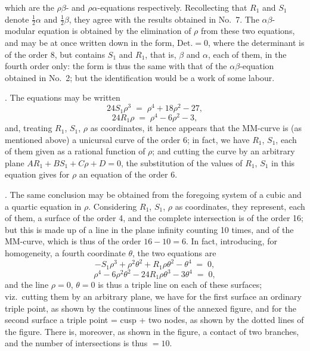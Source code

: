\documentclass[11pt]{article}
\begin{document}
\newpage

\noindent which are the $\rho\beta$- and $\rho\alpha$-equations respectively. Recollecting that $R_1$ and $S_1$ denote $\tfrac{1}{2}\alpha$ and $\tfrac{1}{2}\beta$, they agree with the results obtained in No.~7. The $\alpha\beta$-modular equation is obtained by the elimination of $\rho$ from these two equations, and may be at once written down in the form, $\mathrm{Det.} = 0$, where the determinant is of the order 8, but contains $S_1$ and $R_1$, that is, $\beta$ and $\alpha$, each of them, in the fourth order only: the form is thus the same with that of the $\alpha\beta$-equation obtained in No.~2; but the identification would be a work of some labour.

\medskip

. The equations may be written
\[
24 S_1\rho^3 \;=\; \rho^4 + 18\rho^2 - 27,
\]
\[
24 R_1\rho \;=\; \rho^4 - 6\rho^2 - 3,
\]
and, treating $R_1$, $S_1$, $\rho$ as coordinates, it hence appears that the MM-curve is (as mentioned above) a unicursal curve of the order 6; in fact, we have $R_1$, $S_1$, each of them given as a rational function of $\rho$; and cutting the curve by an arbitrary plane $A R_1 + B S_1 + C\rho + D = 0$, the substitution of the values of $R_1$, $S_1$ in this equation gives for $\rho$ an equation of the order 6.

\medskip

. The same conclusion may be obtained from the foregoing system of a cubic and a quartic equation in $\rho$. Considering $R_1$, $S_1$, $\rho$ as coordinates, they represent, each of them, a surface of the order 4, and the complete intersection is of the order 16; but this is made up of a line in the plane infinity counting 10 times, and of the MM-curve, which is thus of the order $16 - 10 = 6$. In fact, introducing, for homogeneity, a fourth coordinate $\theta$, the two equations are
\[
-S_1\rho^3 + \rho^2\theta^2 + R_1\rho\theta^2 - \theta^4 \;=\; 0,
\]
\[
\rho^4 - 6\rho^2\theta^2 - 24 R_1\rho\theta^3 - 3\theta^4 \;=\; 0,
\]
and the line $\rho = 0$, $\theta = 0$ is thus a triple line on each of these surfaces; viz.\ cutting them by an arbitrary plane, we have for the first surface an ordinary triple point, as shown by the continuous lines of the annexed figure, and for the second surface a triple point = cusp + two nodes, as shown by the dotted lines of the figure. There is, moreover, as shown in the figure, a contact of two branches, and the number of intersections is thus $=10$.

\medskip
\end{document}
